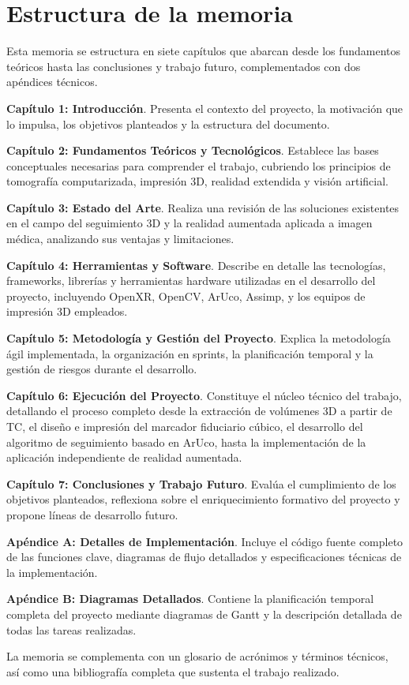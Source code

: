 \section{Estructura de la memoria}

Esta memoria se estructura en siete capítulos que abarcan desde los fundamentos teóricos hasta las conclusiones y trabajo futuro, complementados con dos apéndices técnicos.

\textbf{Capítulo 1: Introducción}. Presenta el contexto del proyecto, la motivación que lo impulsa, los objetivos planteados y la estructura del documento.

\textbf{Capítulo 2: Fundamentos Teóricos y Tecnológicos}. Establece las bases conceptuales necesarias para comprender el trabajo, cubriendo los principios de tomografía computarizada, impresión 3D, realidad extendida y visión artificial.

\textbf{Capítulo 3: Estado del Arte}. Realiza una revisión de las soluciones existentes en el campo del seguimiento 3D y la realidad aumentada aplicada a imagen médica, analizando sus ventajas y limitaciones.

\textbf{Capítulo 4: Herramientas y Software}. Describe en detalle las tecnologías, frameworks, librerías y herramientas hardware utilizadas en el desarrollo del proyecto, incluyendo OpenXR, OpenCV, ArUco, Assimp, y los equipos de impresión 3D empleados.

\textbf{Capítulo 5: Metodología y Gestión del Proyecto}. Explica la metodología ágil implementada, la organización en sprints, la planificación temporal y la gestión de riesgos durante el desarrollo.

\textbf{Capítulo 6: Ejecución del Proyecto}. Constituye el núcleo técnico del trabajo, detallando el proceso completo desde la extracción de volúmenes 3D a partir de TC, el diseño e impresión del marcador fiduciario cúbico, el desarrollo del algoritmo de seguimiento basado en ArUco, hasta la implementación de la aplicación independiente de realidad aumentada.

\textbf{Capítulo 7: Conclusiones y Trabajo Futuro}. Evalúa el cumplimiento de los objetivos planteados, reflexiona sobre el enriquecimiento formativo del proyecto y propone líneas de desarrollo futuro.

\textbf{Apéndice A: Detalles de Implementación}. Incluye el código fuente completo de las funciones clave, diagramas de flujo detallados y especificaciones técnicas de la implementación.

\textbf{Apéndice B: Diagramas Detallados}. Contiene la planificación temporal completa del proyecto mediante diagramas de Gantt y la descripción detallada de todas las tareas realizadas.

La memoria se complementa con un glosario de acrónimos y términos técnicos, así como una bibliografía completa que sustenta el trabajo realizado.
